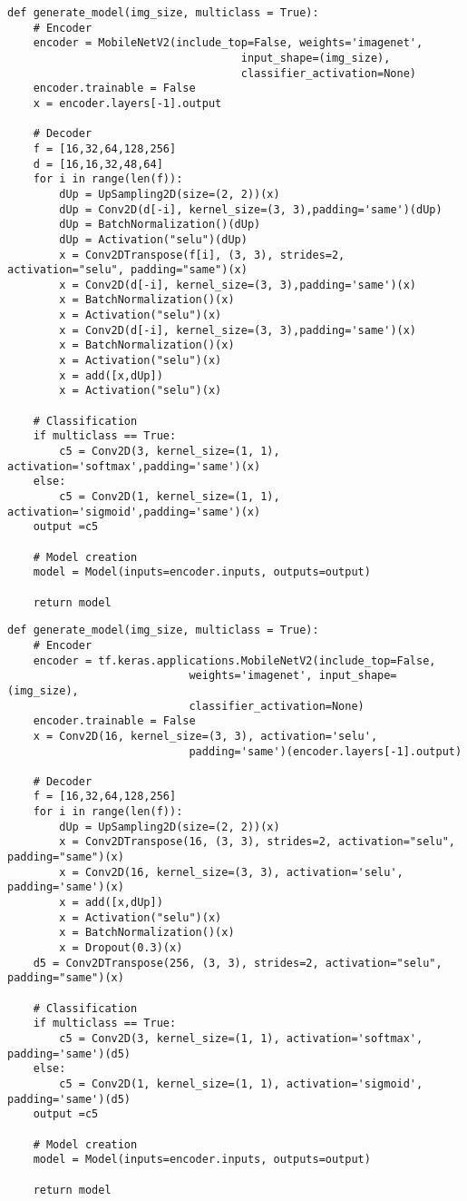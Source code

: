 \begin{lstlisting}[caption={Advanced Decoder}, label={lst:Decoder-AdvancedDecoder}, captionpos=b]
def generate_model(img_size, multiclass = True):
    # Encoder
    encoder = MobileNetV2(include_top=False, weights='imagenet',
                                    input_shape=(img_size),
                                    classifier_activation=None)
    encoder.trainable = False
    x = encoder.layers[-1].output

    # Decoder
    f = [16,32,64,128,256]
    d = [16,16,32,48,64]
    for i in range(len(f)):
        dUp = UpSampling2D(size=(2, 2))(x)
        dUp = Conv2D(d[-i], kernel_size=(3, 3),padding='same')(dUp)
        dUp = BatchNormalization()(dUp)
        dUp = Activation("selu")(dUp)
        x = Conv2DTranspose(f[i], (3, 3), strides=2, activation="selu", padding="same")(x)
        x = Conv2D(d[-i], kernel_size=(3, 3),padding='same')(x)
        x = BatchNormalization()(x)
        x = Activation("selu")(x)
        x = Conv2D(d[-i], kernel_size=(3, 3),padding='same')(x)
        x = BatchNormalization()(x)
        x = Activation("selu")(x)
        x = add([x,dUp])
        x = Activation("selu")(x)
    
    # Classification
    if multiclass == True:
        c5 = Conv2D(3, kernel_size=(1, 1), activation='softmax',padding='same')(x)
    else:
        c5 = Conv2D(1, kernel_size=(1, 1), activation='sigmoid',padding='same')(x)
    output =c5
    
    # Model creation
    model = Model(inputs=encoder.inputs, outputs=output)
    
    return model
\end{lstlisting}
\newpage
\begin{lstlisting}[caption={Advanced Decoder with Dropout},captionpos=b, label={lst:Decoder-Dropout}]
def generate_model(img_size, multiclass = True):
    # Encoder
    encoder = tf.keras.applications.MobileNetV2(include_top=False, 
                            weights='imagenet', input_shape=(img_size),
                            classifier_activation=None)
    encoder.trainable = False
    x = Conv2D(16, kernel_size=(3, 3), activation='selu',
                            padding='same')(encoder.layers[-1].output)
    
    # Decoder
    f = [16,32,64,128,256]
    for i in range(len(f)):
        dUp = UpSampling2D(size=(2, 2))(x)
        x = Conv2DTranspose(16, (3, 3), strides=2, activation="selu", padding="same")(x)
        x = Conv2D(16, kernel_size=(3, 3), activation='selu', padding='same')(x)
        x = add([x,dUp])
        x = Activation("selu")(x)
        x = BatchNormalization()(x)
        x = Dropout(0.3)(x)
    d5 = Conv2DTranspose(256, (3, 3), strides=2, activation="selu", padding="same")(x)
    
    # Classification
    if multiclass == True:
        c5 = Conv2D(3, kernel_size=(1, 1), activation='softmax', padding='same')(d5)
    else:
        c5 = Conv2D(1, kernel_size=(1, 1), activation='sigmoid', padding='same')(d5)
    output =c5
    
    # Model creation
    model = Model(inputs=encoder.inputs, outputs=output)
    
    return model
\end{lstlisting}
